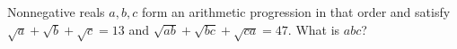 Nonnegative reals $a,b,c$ form an arithmetic progression in that order and satisfy $\sqrt a+\sqrt b+\sqrt c=13$ and $\sqrt{ab}+\sqrt{bc}+\sqrt{ca}=47$. What is $abc$?
